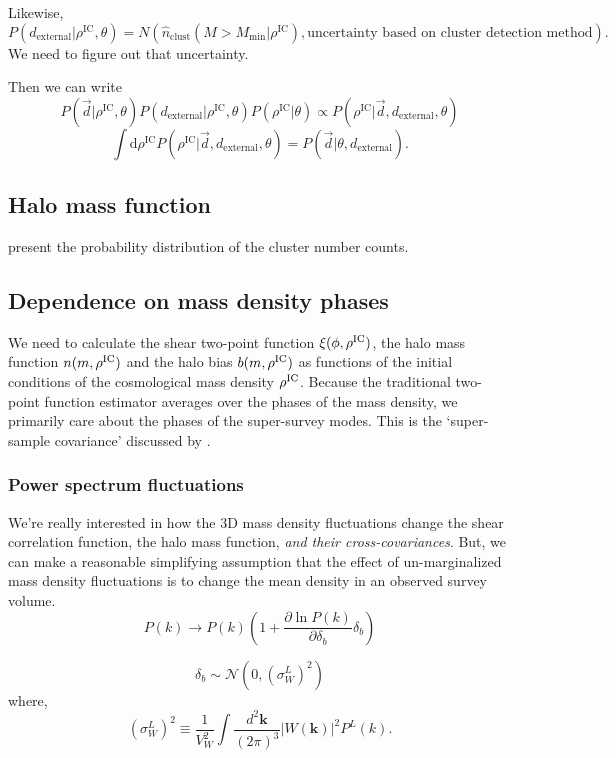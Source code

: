 \documentclass[preprint]{aastex}
\newcommand{\beq}{\begin{equation}}
\newcommand{\eeq}{\end{equation}}
\newcommand{\kv}{\mathbf{k}}
\newcommand{\skyangle}{\phi}
\newcommand{\rhoic}{\rho^{\rm IC}}
\newcommand{\normdist}{\mathcal{N}}
\begin{document}
Likewise,
\beq
P(d_\text{external}|\rho^\text{IC},\theta) = N(\hat{n}_\text{clust}(M>M_\text{min} |
\rho^\text{IC}), \text{uncertainty based on cluster detection method}).
\eeq
We need to figure out that uncertainty.

Then we can write
\beq
P(\vec{d}|\rho^\text{IC},\theta)P(d_\text{external}|\rho^\text{IC},\theta)P(\rho^\text{IC}|\theta)
\propto P(\rho^\text{IC}|\vec{d},d_\text{external},\theta)
\eeq
\beq
\int \mathrm{d}\rho^\text{IC} P(\rho^\text{IC}|\vec{d},d_\text{external},\theta) = P(\vec{d}|\theta,
d_\text{external}).
\eeq



\subsection{Halo mass function}
\citet{lima2004} present the probability distribution of the cluster number counts.


\subsection{Dependence on mass density phases} %
\label{sub:dependence_on_mass_density_phases}
We need to calculate the shear two-point function $\xi(\skyangle, \rhoic)$, 
the halo mass function $n(m, \rhoic)$
and the halo bias $b(m, \rhoic)$ as functions of the initial conditions of the 
cosmological mass density $\rhoic$. 
Because the traditional two-point function estimator averages over the phases 
of the mass density, we primarily care about the phases of the super-survey 
modes. This is the `super-sample covariance' discussed by 
\citet{takada2013}.

\subsubsection{Power spectrum fluctuations}
We're really interested in how the 3D mass density fluctuations change the
shear correlation function, the halo mass function, \emph{and their 
cross-covariances}. But, we can make a reasonable simplifying assumption that 
the effect of un-marginalized mass density fluctuations is to change the mean density 
in an observed survey volume. 
\begin{equation}
	P(k) \rightarrow P(k) \left(
	1 + \frac{\partial \ln P(k)}{\partial \delta_b} \delta_b\right)
\end{equation}

\begin{equation}
	\delta_b \sim \normdist
	\left(0, \left(\sigma_W^L\right)^{2}\right)
\end{equation}
where,
\begin{equation}
	\left(\sigma_{W}^{L}\right)^{2} \equiv
	\frac{1}{V_{W}^{2}} 
	\int \frac{d^{2}\kv}{(2\pi)^3}
	\left|W(\kv)\right|^{2}
	P^{L}(k).
\end{equation}
\end{document}
